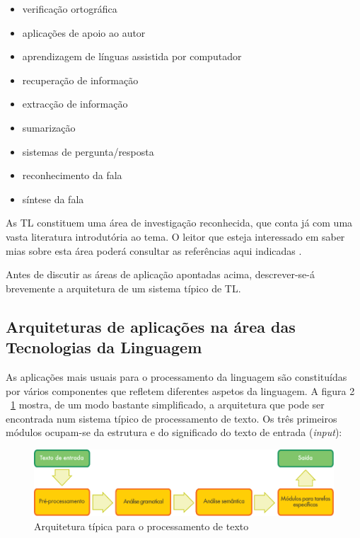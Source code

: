 \begin{multicols}{2}
\begin{itemize}
      \item verificação ortográfica
      \item aplicações de apoio ao autor
      \item aprendizagem de línguas assistida por computador
      \item recuperação de informação 
      \item extracção de informação
      \item sumarização
      \item sistemas de pergunta/resposta
      \item reconhecimento da fala 
      \item síntese da fala 
\end{itemize}

As TL constituem uma área de investigação reconhecida, que conta já com uma vasta literatura introdutória ao tema. O leitor que esteja interessado em saber mias sobre esta área poderá consultar as referências aqui indicadas \cite{carstensen-etal1} \cite{jurafsky-martin01} \cite{manning-schuetze1} \cite{lt-world1} \cite{lt-survey1}.

 Antes de discutir as áreas de aplicação apontadas acima, descrever-se-á brevemente a arquitetura de um sistema típico de TL. 

\subsection{Arquiteturas de aplicações na área das Tecnologias da Linguagem}

 As aplicações mais usuais para o processamento da linguagem são constituídas por vários componentes que refletem diferentes aspetos da linguagem. A figura 2 ~\ref{fig:textprocessingarch_de} mostra, de um modo bastante simplificado, a arquitetura que pode ser encontrada num sistema típico de processamento de texto. Os três primeiros módulos ocupam-se da estrutura e do significado do texto de entrada (\textit{input}):

\begin{figure}[htb]
  \center
  \includegraphics[width=\textwidth]{../_media/portuguese/text_processing_app_architecture}
  \caption{Arquitetura típica para o processamento de texto}
  \label{fig:textprocessingarch_de}
\end{figure}


\end{multicols}
